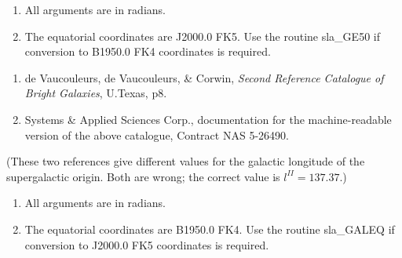 {
}
{
}
{
}
\notes
{
 \begin{enumerate}
  \item All arguments are in radians.
  \item The equatorial coordinates are J2000.0 FK5.  Use the routine
        sla\_GE50 if conversion to B1950.0 FK4 coordinates is
                           required.
 \end{enumerate}
}
{
}
{
}
{
}
{
 \begin{enumerate}
  \item de Vaucouleurs, de Vaucouleurs, \& Corwin, {\it Second Reference
    Catalogue of Bright Galaxies}, U.Texas, p8.
  \item Systems \& Applied Sciences Corp., documentation for the
        machine-readable version of the above catalogue,
        Contract NAS 5-26490.
 \end{enumerate}
 (These two references give different values for the galactic
 longitude of the supergalactic origin.  Both are wrong;  the
 correct value is $l^{I\!I}=137.37$.)
}
{
}
{
}
{
}
\notes
{
 \begin{enumerate}
  \item All arguments are in radians.
  \item The equatorial coordinates are B1950.0 FK4.  Use the
        routine sla\_GALEQ if conversion to J2000.0 FK5 coordinates
        is required.
 \end{enumerate}
}
